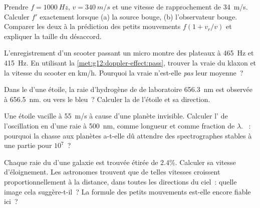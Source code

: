 \begin{exercise}[$\star\star$]\label{exo:g12:doppler-effect:9}
Prendre $f = \qty{1000}{Hz}$, $v = \qty{340}{m/s}$ et une vitesse de
rapprochement de \qty{34}{m/s}. Calculer $f'$ exactement lorsque
(a) la source bouge, (b) l'observateur bouge. Comparer les deux à la
prédiction des petits mouvements $f(1 + v_r/v)$ et expliquer la taille
du désaccord.
\end{exercise}

\begin{exercise}[$\star\star$]\label{exo:g12:doppler-effect:10}
L'enregistrement d'un scooter passant un micro montre des plateaux à
\qty{465}{Hz} et \qty{415}{Hz}. En utilisant la
\cref{met:g12:doppler-effect:pass}, trouver la vraie
 du klaxon et la vitesse du scooter en
\unit{km/h}. Pourquoi la vraie  n'est-elle
\emph{pas} leur moyenne~?
\end{exercise}

\begin{exercise}[$\star\star$]\label{exo:g12:doppler-effect:11}
Dans le  d'une étoile, la raie d'hydrogène de
 de laboratoire \qty{656.3}{nm} est observée
à \qty{656.5}{nm}.  ou
vers le bleu~? Calculer la 
de l'étoile et sa direction.
\end{exercise}

\begin{exercise}[$\star\star\star$]\label{exo:g12:doppler-effect:12}
Une étoile vacille à \qty{55}{m/s} à cause d'une planète invisible.
Calculer l' de l'oscillation en
 d'une raie à \qty{500}{nm}, comme
longueur et comme fraction de $\lambda$. ~: pourquoi la chasse aux planètes a-t-elle dû attendre des
spectrographes stables à une partie pour $10^{7}$~?
\end{exercise}

\begin{exercise}[$\star\star\star$]\label{exo:g12:doppler-effect:13}
Chaque raie du  d'une galaxie est trouvée étirée de
$2.4\%$. Calculer sa vitesse d'éloignement. Les astronomes trouvent
que de telles vitesses croissent proportionnellement à la distance,
dans toutes les directions du ciel~: quelle image cela suggère-t-il~?
La formule des petits mouvements est-elle encore fiable ici~?
\end{exercise}

